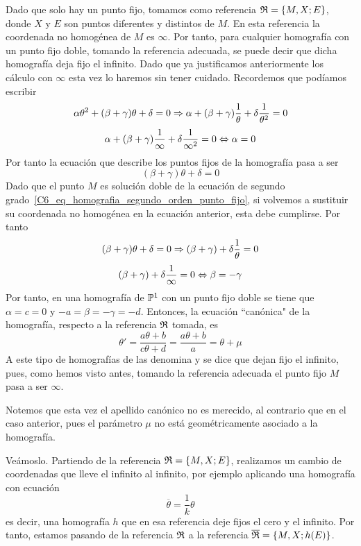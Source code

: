 Dado que solo hay un punto fijo, tomamos como referencia $\mathfrak{R}=\{M,X;E\}$, donde $X$ y $E$ son puntos diferentes y distintos de $M$. En esta referencia la coordenada no homogénea de $M$ es $\infty$. Por tanto, para cualquier homografía con un punto fijo doble, tomando la referencia adecuada, se puede decir que dicha homografía deja fijo el infinito. Dado que ya justificamos anteriormente los cálculo con $\infty$ esta vez lo haremos sin tener cuidado. Recordemos que podíamos escribir
\begin{equation*}
	\alpha\theta^2+(\beta+\gamma)\theta+\delta=0\Rightarrow\alpha+(\beta+\gamma)\frac{1}{\theta}+\delta\frac{1}{\theta^2}=0
\end{equation*}
\begin{equation*}
	\alpha+(\beta+\gamma)\frac{1}{\infty}+\delta\frac{1}{\infty^2}=0\Leftrightarrow \alpha=0
\end{equation*}
Por tanto la ecuación que describe los puntos fijos de la homografía pasa a ser
\begin{equation*}
	(\beta+\gamma)\theta+\delta=0
\end{equation*}
Dado que el punto $M$ es solución doble de la ecuación de segundo grado~\eqref{C6_eq_homografia_segundo_orden_punto_fijo}, si volvemos a sustituir su coordenada no homogénea en la ecuación anterior, esta debe cumplirse. Por tanto
\begin{equation*}
	(\beta+\gamma)\theta+\delta=0\Rightarrow(\beta+\gamma)+\delta\frac{1}{\theta}=0
\end{equation*}
\begin{equation*}
	(\beta+\gamma)+\delta\frac{1}{\infty}=0\Leftrightarrow \beta=-\gamma
\end{equation*}
Por tanto, en una homografía de $\mathbb{P}^1$ con un punto fijo doble se tiene que $\alpha=c=0$ y $-a=\beta=-\gamma=-d$. Entonces, la ecuación ``canónica" de la homografía, respecto a la referencia $\mathfrak{R}$ tomada, es
\begin{equation}
\theta'=\frac{a\theta+b}{c\theta +d}=\frac{a\theta+b}{a}=\theta+\mu
\end{equation}
A este tipo de homografías de las denomina  y se dice que dejan fijo el infinito, pues, como hemos visto antes, tomando la referencia adecuada el punto fijo $M$ pasa a ser $\infty$.

Notemos que esta vez el apellido canónico no es merecido, al contrario que en el caso anterior, pues el parámetro $\mu$ no está geométricamente asociado a la homografía. 

Veámoslo. Partiendo de la referencia $\mathfrak{R}=\{M,X;E\}$, realizamos un cambio de coordenadas que lleve el infinito al infinito, por ejemplo aplicando una homografía con ecuación
\begin{equation*}
	\overline{\theta}=\frac{1}{k}\theta
\end{equation*}
es decir, una homografía $h$ que en esa referencia deje fijos el cero y el infinito. Por tanto, estamos pasando de la referencia $\mathfrak{R}$ a la referencia $\overline{\mathfrak{R}}=\{M,X;h(E)\}$. 

